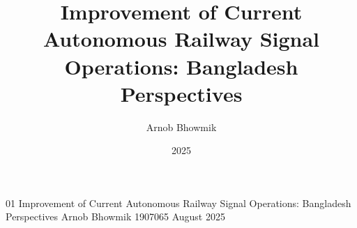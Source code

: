 \documentclass[12pt,oneside,letterpaper]{memoir}
\begin{document}

\ifpdf
{}
\else
{}
\fi

\frontsheet
  {01} %
  {Improvement of Current Autonomous Railway Signal Operations: Bangladesh Perspectives} %
  {Arnob Bhowmik} %
  {1907065} %
  {August 2025} %

\title{Improvement of Current Autonomous Railway Signal Operations: Bangladesh Perspectives}
\author{Arnob Bhowmik}
\date{2025}


\maketitle



 
 
 
 

 
 
 
 
 

\begin{appendices}
\end{appendices}



\end{document}
